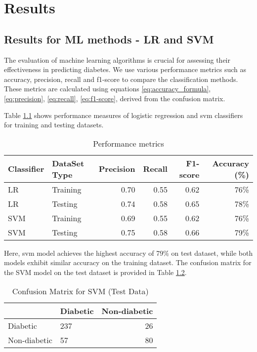 \chapter{Results}
\label{ch:results}
\section{Results for ML methods - LR and SVM}
The evaluation of machine learning algorithms is crucial for assessing their effectiveness in predicting diabetes. We use various performance metrics such as accuracy, precision, recall and f1-score to compare the classification methods. These metrics are calculated using equations \ref{eq:accuracy_formula}, \ref{eq:precision}, \ref{eq:recall}, \ref{eq:f1-score}, derived from the confusion matrix.

Table \ref{tab:p_metrics} shows performance measures of logistic regression and svm classifiers for training and testing datasets.

\begin{table}[h!]
    \centering
    \caption{Performance metrics}
    \label{tab:p_metrics}
    \begin{tabular}{llrrrr}     
        \toprule
        Classifier  &   DataSet Type &   Precision   &   Recall  &   F1-score    &   Accuracy (\%) \\
        \midrule
        LR  &   Training    &   0.70   &   0.55   &   0.62    &   76\%   \\
        LR  &   Testing &   0.74   &   0.58   &   0.65    &   78\%   \\
        SVM  &   Training    &   0.69   &   0.55   &   0.62    &   76\%   \\
        SVM  &   Testing &   0.75   &   0.58   &   0.66    &   79\%   \\
        \bottomrule
    \end{tabular}
\end{table}

Here, svm model achieves the highest accuracy of 79\% on test dataset, while both models exhibit similar accuracy on the training dataset. The confusion matrix for the SVM model on the test dataset is provided in Table \ref{tab:conf_matrix}.

\begin{table}[h!]
    \centering
    \caption{Confusion Matrix for SVM (Test Data)}
    \label{tab:conf_matrix}
    \begin{tabular}{llr}     
        \toprule
        & Diabetic  &   Non-diabetic \\
        \midrule
        Diabetic &  237  &   26   \\
        Non-diabetic &  57    &   80  \\
        \bottomrule
    \end{tabular}
\end{table}

